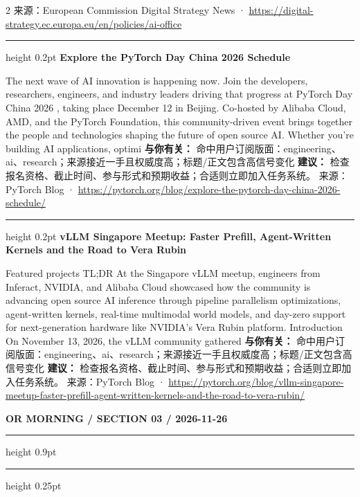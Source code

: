 \documentclass[10.5pt]{ctexart}
\begin{document}
\begin{multicols}{2}
{\footnotesize\color{ormuted} 来源：European Commission Digital Strategy News · \url{https://digital-strategy.ec.europa.eu/en/policies/ai-office}}
\vspace{2mm}
\hrule height 0.2pt
\vspace{2mm}
{\large\bfseries Explore the PyTorch Day China 2026 Schedule}\par
The next wave of AI innovation is happening now. Join the developers, researchers, engineers, and industry leaders driving that progress at PyTorch Day China 2026 , taking place December 12 in Beijing. Co-hosted by Alibaba Cloud, AMD, and the PyTorch Foundation, this community-driven event brings together the people and technologies shaping the future of open source AI. Whether you’re building AI applications, optimi
\textbf{与你有关：} 命中用户订阅版面：engineering、ai、research；来源接近一手且权威度高；标题/正文包含高信号变化
\textbf{建议：} 检查报名资格、截止时间、参与形式和预期收益；合适则立即加入任务系统。
{\footnotesize\color{ormuted} 来源：PyTorch Blog · \url{https://pytorch.org/blog/explore-the-pytorch-day-china-2026-schedule/}}
\vspace{2mm}
\hrule height 0.2pt
\vspace{2mm}
{\large\bfseries vLLM Singapore Meetup: Faster Prefill, Agent-Written Kernels and the Road to Vera Rubin}\par
Featured projects TL;DR At the Singapore vLLM meetup, engineers from Inferact, NVIDIA, and Alibaba Cloud showcased how the community is advancing open source AI inference through pipeline parallelism optimizations, agent-written kernels, real-time multimodal world models, and day-zero support for next-generation hardware like NVIDIA’s Vera Rubin platform. Introduction On November 13, 2026, the vLLM community gathered
\textbf{与你有关：} 命中用户订阅版面：engineering、ai、research；来源接近一手且权威度高；标题/正文包含高信号变化
\textbf{建议：} 检查报名资格、截止时间、参与形式和预期收益；合适则立即加入任务系统。
{\footnotesize\color{ormuted} 来源：PyTorch Blog · \url{https://pytorch.org/blog/vllm-singapore-meetup-faster-prefill-agent-written-kernels-and-the-road-to-vera-rubin/}}
\end{multicols}
\newpage
{\small\bfseries OR MORNING / SECTION 03 / 2026-11-26}
\vspace{2mm}
\hrule height 0.9pt
\vspace{1.5mm}
\hrule height 0.25pt
\vspace{4mm}
\end{document}
